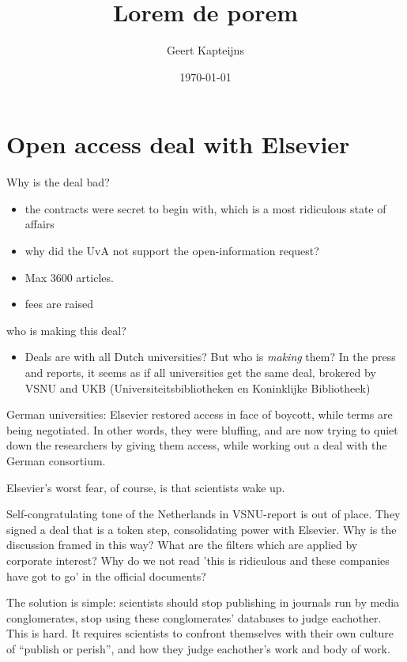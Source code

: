 \documentclass[12pt,twocolumn, openany, article]{memoir}
\begin{document}
\pretitle{\begin{center}\HUGE\headingfont}

\title{Lorem de porem}

\author{Geert Kapteijns}
\date{\today}
\maketitle

\section*{Open access deal with Elsevier}
Why is the deal bad?

\begin{itemize}
  \item the contracts were secret to begin with, which is a most ridiculous state of affairs
  \item why did the UvA not support the open-information request?
  \item Max 3600 articles.
  \item fees are raised
\end{itemize}

who is making this deal?

\begin{itemize}
  \item Deals are with all Dutch universities?
  But who is \emph{making} them?
  In the press and reports, it seems as if all universities get the same deal,
  brokered by VSNU and UKB (Universiteitsbibliotheken en Koninklijke Bibliotheek)
\end{itemize}

German universities:
Elsevier restored access in face of boycott, while terms are being negotiated.
In other words, they were bluffing, and are now trying to quiet down the researchers by giving them access,
while working out a deal with the German consortium.

Elsevier's worst fear, of course, is that scientists wake up.

Self-congratulating tone of the Netherlands in VSNU-report is out of
place. They signed a deal that is a token step, consolidating power with
Elsevier. Why is the discussion framed in this way? What are the filters
which are applied by corporate interest? Why do we not read 'this is
ridiculous and these companies have got to go' in the official documents?

The solution is simple: scientists should stop publishing in journals run
by media conglomerates, stop using these conglomerates' databases to judge
eachother. This is hard. It requires scientists to confront themselves
with their own culture of \enquote{publish or perish}, and how they judge
eachother's work and body of work.
\end{document}
